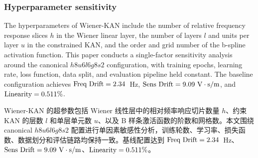 \documentclass[sn-nature]{sn-jnl}
\newif\ifCNENEnglish
\newif\ifCNENBilingual
\newcommand{\CNEN}[2]{%
    \ifCNENBilingual
        #1%
        \if\relax\detokenize{#2}\relax\else\par #2\fi%
    \else
        \ifCNENEnglish
            #2%
        \else
            #1%
        \fi
    \fi
}
\begin{document}
\subsubsection{Hyperparameter sensitivity}



\CNEN{Wiener-KAN 的超参数包括 Wiener 线性层中的相对频率响应切片数量 $h$、约束 KAN 的层数 $l$ 和单层单元数 $u$、以及 B 样条激活函数的阶数和网格数。本文围绕 canonical $h8u6l6g8s2$ 配置进行单因素敏感性分析，训练轮数、学习率、损失函数、数据划分和评估链路均保持一致。基线配置达到 $\textrm{Freq~Drift}=2.34$~Hz、$\textrm{Sens~Drift}=9.09~\text{V}\cdot\text{s}/\text{m}$、$\textrm{Linearity}=0.511\%$。}{The hyperparameters of Wiener-KAN include the number of relative frequency response slices $h$ in the Wiener linear layer, the number of layers $l$ and units per layer $u$ in the constrained KAN, and the order and grid number of the b-spline activation function. This paper conducts a single-factor sensitivity analysis around the canonical $h8u6l6g8s2$ configuration, with training epochs, learning rate, loss function, data split, and evaluation pipeline held constant. The baseline configuration achieves $\textrm{Freq~Drift}=2.34$~Hz, $\textrm{Sens~Drift}=9.09~\text{V}\cdot\text{s}/\text{m}$, and $\textrm{Linearity}=0.511\%$.%
}
\end{document}
